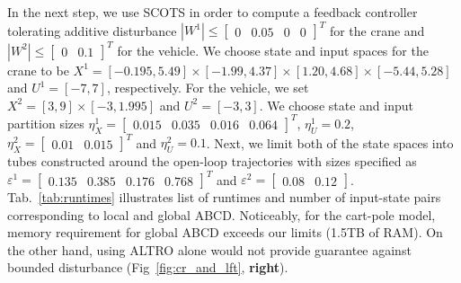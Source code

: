In the next step, we use SCOTS in order to compute a feedback controller tolerating additive disturbance $|W^1|\leq\begin{bmatrix}0&0.05&0&0\end{bmatrix}^T$ for the crane and $|W^2|\leq\begin{bmatrix}0&0.1\end{bmatrix}^T$ for the vehicle. %
We choose state and input spaces for the crane to be $X^{1}=[-0.195,5.49]\times[-1.99,4.37]\times[1.20,4.68]\times[-5.44,5.28]$ and $U^{1}=[-7,7]$, respectively. For the vehicle, we set $X^{2}=[3,9]\times[-3,1.995]$ and $U^{2}=[-3,3]$. %
We choose state and input partition sizes $\eta_{{X}}^{1}=\begin{bmatrix}0.015&0.035&0.016&0.064\end{bmatrix}^T$, $\eta_{U}^1=0.2$,  $\eta_{{X}}^2=\begin{bmatrix}0.01&0.015\end{bmatrix}^T$ and $\eta_{U}^2=0.1$. %
Next, we limit both of the state spaces into tubes constructed around the open-loop trajectories with sizes specified as $\varepsilon^{1}=\begin{bmatrix}0.135&0.385&0.176 &0.768\end{bmatrix}^T$ and $\varepsilon^{2}=\begin{bmatrix}0.08&0.12\end{bmatrix}$. %
Tab.~\ref{tab:runtimes} illustrates list of runtimes and number of input-state pairs corresponding to local and global ABCD. Noticeably, for the cart-pole model, memory requirement for global ABCD exceeds our limits (1.5TB of RAM). On the other hand, using ALTRO alone would not provide guarantee against bounded disturbance (Fig~\ref{fig:cr_and_lft}, \textbf{right}). 

